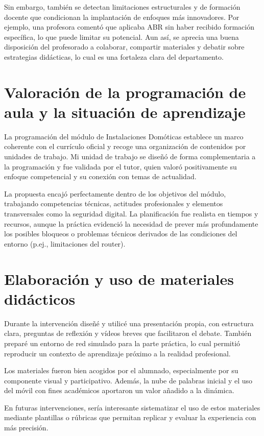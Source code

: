 Sin embargo, también se detectan limitaciones estructurales y de formación docente que condicionan la implantación de enfoques más innovadores. Por ejemplo, una profesora comentó que aplicaba ABR sin haber recibido formación específica, lo que puede limitar su potencial. Aun así, se aprecia una buena disposición del profesorado a colaborar, compartir materiales y debatir sobre estrategias didácticas, lo cual es una fortaleza clara del departamento.

\section{Valoración de la programación de aula y la situación de aprendizaje}

La programación del módulo de Instalaciones Domóticas establece un marco coherente con el currículo oficial y recoge una organización de contenidos por unidades de trabajo. Mi unidad de trabajo se diseñó de forma complementaria a la programación y fue validada por el tutor, quien valoró positivamente su enfoque competencial y su conexión con temas de actualidad.

La propuesta encajó perfectamente dentro de los objetivos del módulo, trabajando competencias técnicas, actitudes profesionales y elementos transversales como la seguridad digital. La planificación fue realista en tiempos y recursos, aunque la práctica evidenció la necesidad de prever más profundamente los posibles bloqueos o problemas técnicos derivados de las condiciones del entorno (p.ej., limitaciones del router).

\section{Elaboración y uso de materiales didácticos}

Durante la intervención diseñé y utilicé una presentación propia, con estructura clara, preguntas de reflexión y vídeos breves que facilitaron el debate. También preparé un entorno de red simulado para la parte práctica, lo cual permitió reproducir un contexto de aprendizaje próximo a la realidad profesional.

Los materiales fueron bien acogidos por el alumnado, especialmente por su componente visual y participativo. Además, la nube de palabras inicial y el uso del móvil con fines académicos aportaron un valor añadido a la dinámica.

En futuras intervenciones, sería interesante sistematizar el uso de estos materiales mediante plantillas o rúbricas que permitan replicar y evaluar la experiencia con más precisión.

